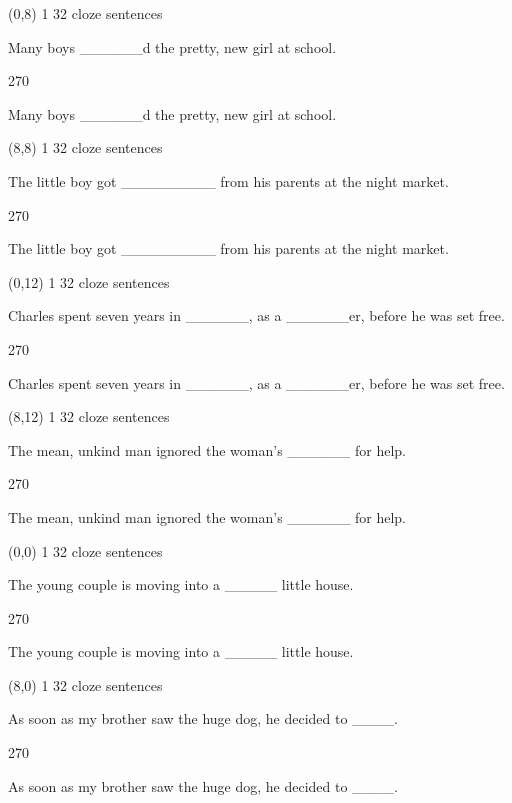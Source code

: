 \documentclass[a4paper]{article}
\newenvironment{itemize*}%
{\begin{itemize}%
 \setlength{\itemsep}{0.5cm}%
 \setlength{\parsep}{0pt}%
 \setlength{\parskip}{0pt}}%
{\end{itemize}}
\newcommand{\mycard}[3]{%
	\small #1 #2
	\par
	\parbox[t][6.8cm][c]{9.5cm}{%
	\par
	\myleft{#3}
	\par
	\myright{#3}
	}
}
\newcommand{\myleft}[1]{%
	\begin{sideways}
	\hspace*{-0.9cm}
		\parbox[t][2.7cm][t]{6.5cm}{%
		\large #1
		}
	\end{sideways}
}
\newcommand{\myright}[1]{%
	\hspace*{6.5cm}
	\begin{turn}{270}
	\hspace*{-7.1cm}
		\parbox[t][2.7cm][t]{6.5cm}{%
		\large #1
		}
	\end{turn}
}
\begin{document}
\begin{textblock}{8}(0,8)
\mycard{1}{32 cloze sentences}{
\begin{itemize*}
\item Many boys \_\_\_\_\_\_d the pretty, new girl at school.
\end{itemize*}
}
\end{textblock}

\begin{textblock}{8}(8,8)
\mycard{1}{32 cloze sentences}{
\begin{itemize*}
\item The little boy got \_\_\_\_\_\_\_\_\_ from his parents at the night market.
\end{itemize*}
}
\end{textblock}

\begin{textblock}{8}(0,12)
\mycard{1}{32 cloze sentences}{
\begin{itemize*}
\item Charles spent seven years in \_\_\_\_\_\_, as a \_\_\_\_\_\_er, before he was set free.
\end{itemize*}
}
\end{textblock}

\begin{textblock}{8}(8,12)
\mycard{1}{32 cloze sentences}{
\begin{itemize*}
\item The mean, unkind man ignored the woman's \_\_\_\_\_\_ for help.
\end{itemize*}
}
\end{textblock}

\null
\newpage

\begin{textblock}{8}(0,0)
\mycard{1}{32 cloze sentences}{
\begin{itemize*}
\item The young couple is moving into a \_\_\_\_\_ little house.
\end{itemize*}
}
\end{textblock}

\begin{textblock}{8}(8,0)
\mycard{1}{32 cloze sentences}{
\begin{itemize*}
\item As soon as my brother saw the huge dog, he decided to \_\_\_\_.
\end{itemize*}
}
\end{textblock}
\end{document}
